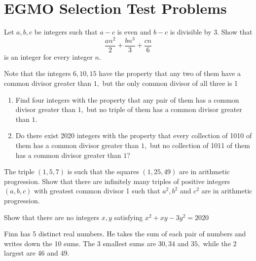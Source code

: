 \documentclass{pset}
\begin{document}
\section*{EGMO Selection Test Problems}

\begin{problems}
    \begin{problem}
    Let \(a, b, c\) be integers such that \(a-c\) is even and \(b-c\) is divisible by \(3 .\) Show that
    $$
        \frac{a n^{2}}{2}+\frac{b n^{3}}{3}+\frac{c n}{6}
    $$
    is an integer for every integer \(n\).
    \end{problem}

    \begin{problem}
    Note that the integers \(6,10,15\) have the property that any two of them have a common divisor greater than
    \(1,\) but the only common divisor of all three is 1
    \begin{enumerate}
        \item Find four integers with the property that any pair of them has a common divisor greater than \(1,\) but no triple of them has a common divisor greater than \(1 .\)
        \item Do there exist 2020 integers with the property that every collection of 1010 of them has a common divisor greater than \(1,\) but no collection of 1011 of them has a common divisor greater than \(1 ?\)
    \end{enumerate}
    \end{problem}

    \begin{problem}
    The triple \((1,5,7)\) is such that the squares \((1,25,49)\) are in arithmetic progression. Show that there are infinitely many triples of positive integers \((a, b, c)\) with greatest common divisor 1 such that \(a^{2}, b^{2}\) and \(c^{2}\)
    are in arithmetic progression.
    \end{problem}

    \begin{problem}
    Show that there are no integers \(x, y\) satisfying \(x^{2}+x y-3 y^{2}=2020\)
    \end{problem}

    \begin{problem}
    Finn has 5 distinct real numbers. He takes the sum of each pair of numbers and writes down the 10 sums. The 3 smallest sums are \(30,34\) and \(35,\) while the 2 largest are 46 and \(49 .\)


\end{problem}
\end{problems}
\end{document}
